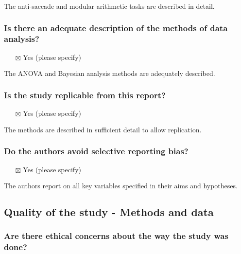\documentclass[
  doc, a4paper]{apa7}
\providecommand{\tightlist}{%
  \setlength{\itemsep}{0pt}\setlength{\parskip}{0pt}}
\begin{document}
The anti-saccade and modular arithmetic tasks are described in detail.

\subsubsection{Is there an adequate description of the methods of data analysis?}\label{is-there-an-adequate-description-of-the-methods-of-data-analysis}

\begin{itemize}
\tightlist
\item[$\boxtimes$]
  Yes (please specify)
\end{itemize}

The ANOVA and Bayesian analysis methods are adequately described.

\subsubsection{Is the study replicable from this report?}\label{is-the-study-replicable-from-this-report}

\begin{itemize}
\tightlist
\item[$\boxtimes$]
  Yes (please specify)
\end{itemize}

The methods are described in sufficient detail to allow replication.

\subsubsection{Do the authors avoid selective reporting bias?}\label{do-the-authors-avoid-selective-reporting-bias}

\begin{itemize}
\tightlist
\item[$\boxtimes$]
  Yes (please specify)
\end{itemize}

The authors report on all key variables specified in their aims and hypotheses.

\subsection{Quality of the study - Methods and data}\label{quality-of-the-study---methods-and-data}

\subsubsection{Are there ethical concerns about the way the study was done?}\label{are-there-ethical-concerns-about-the-way-the-study-was-done}
\end{document}

